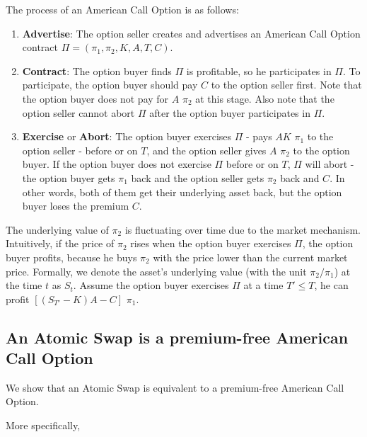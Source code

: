 The process of an American Call Option is as follows:

\begin{enumerate}
    \item \textbf{Advertise}: The option seller creates and advertises an American Call Option contract $\Pi = (\pi_1, \pi_2, K, A, T, C)$.
    \item \textbf{Contract}: The option buyer finds $\Pi$ is profitable, so he participates in $\Pi$.
    To participate, the option buyer should pay $C$ to the option seller first.
    Note that the option buyer does not pay for $A$ $\pi_2$ at this stage.
    Also note that the option seller cannot abort $\Pi$ after the option buyer participates in $\Pi$.
    \item \textbf{Exercise} or \textbf{Abort}: The option buyer exercises $\Pi$ - pays $AK$ $\pi_1$ to the option seller - before or on $T$, and the option seller gives $A$ $\pi_2$ to the option buyer.
    If the option buyer does not exercise $\Pi$ before or on $T$, $\Pi$ will abort - the option buyer gets $\pi_1$ back and the option seller gets $\pi_2$ back and $C$. In other words, both of them get their underlying asset back, but the option buyer loses the premium $C$.
\end{enumerate}

The underlying value of $\pi_2$ is fluctuating over time due to the market mechanism.
Intuitively, if the price of $\pi_2$ rises when the option buyer exercises $\Pi$, the option buyer profits, because he buys $\pi_2$ with the price lower than the current market price.
Formally, we denote the asset's underlying value (with the unit $\pi_2 / \pi_1$) at the time $t$ as $S_t$.
Assume the option buyer exercises $\Pi$ at a time $T' \leq T$, he can profit $[(S_{T'} - K) A - C]$ $\pi_1$.













\subsection{An Atomic Swap is a premium-free American Call Option}

We show that an Atomic Swap is equivalent to a premium-free American Call Option.

More specifically,

